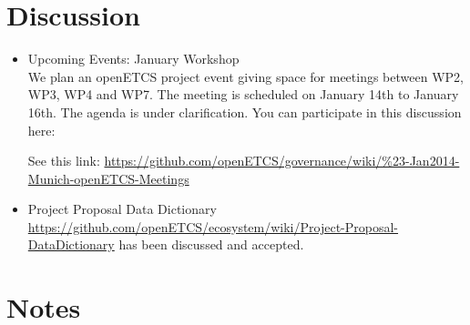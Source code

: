 \documentclass[a4paper, 11pt]{article}
\begin{document}
\section{Discussion}
\begin{itemize}

\item Upcoming Events: January Workshop\\
We plan an openETCS project event giving space for meetings between WP2, WP3, WP4 and WP7. The meeting is scheduled on January 14th to January 16th. The agenda is under clarification. You can participate in this discussion here:


See this link: \url{https://github.com/openETCS/governance/wiki/%23-Jan2014-Munich-openETCS-Meetings}

\item Project Proposal Data Dictionary\\
\url{https://github.com/openETCS/ecosystem/wiki/Project-Proposal-DataDictionary}
has been discussed and accepted.

\end{itemize}

\section{Notes}
\end{document}
